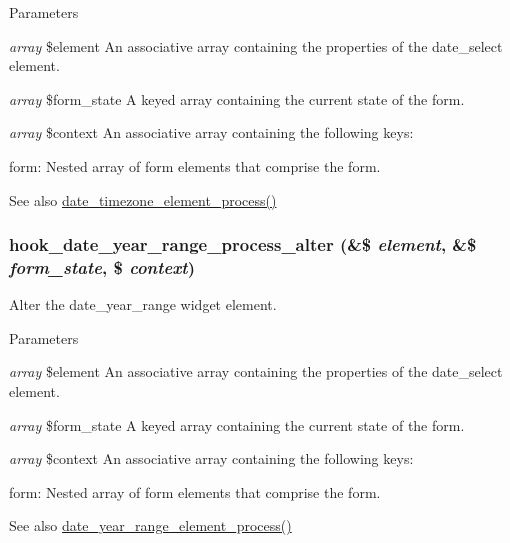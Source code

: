\begin{DoxyParams}{Parameters}
\item[{\em array}]\$element An associative array containing the properties of the date\_\-select element. \item[{\em array}]\$form\_\-state A keyed array containing the current state of the form. \item[{\em array}]\$context An associative array containing the following keys:
\begin{DoxyItemize}
\item form: Nested array of form elements that comprise the form.
\end{DoxyItemize}\end{DoxyParams}
\begin{DoxySeeAlso}{See also}
\hyperlink{date__api__elements_8inc_ac45026ff7ec5ee2113dbbeec0a079aa5}{date\_\-timezone\_\-element\_\-process()} 
\end{DoxySeeAlso}
\hypertarget{date_8api_8php_ad2c977542770de5a0d5e170ecc5a0052}{
\subsubsection[{hook\_\-date\_\-year\_\-range\_\-process\_\-alter}]{\setlength{\rightskip}{0pt plus 5cm}hook\_\-date\_\-year\_\-range\_\-process\_\-alter (\&\$ {\em element}, \/  \&\$ {\em form\_\-state}, \/  \$ {\em context})}}
\label{date_8api_8php_ad2c977542770de5a0d5e170ecc5a0052}
Alter the date\_\-year\_\-range widget element.


\begin{DoxyParams}{Parameters}
\item[{\em array}]\$element An associative array containing the properties of the date\_\-select element. \item[{\em array}]\$form\_\-state A keyed array containing the current state of the form. \item[{\em array}]\$context An associative array containing the following keys:
\begin{DoxyItemize}
\item form: Nested array of form elements that comprise the form.
\end{DoxyItemize}\end{DoxyParams}
\begin{DoxySeeAlso}{See also}
\hyperlink{date__api__elements_8inc_a543c5f0338ae1931c7a626a896f6f2c0}{date\_\-year\_\-range\_\-element\_\-process()} 
\end{DoxySeeAlso}
